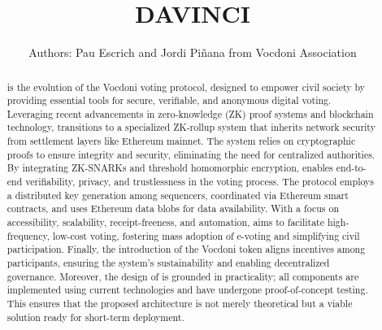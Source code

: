 \documentclass[runningheads, draft]{llncs}
\title{\textsc{DAVINCI}\vspace{-0.4cm}}
\author{Authors: Pau Escrich and Jordi Piñana from Vocdoni Association}
\institute{Last update: \today}
\begin{document}
	
\maketitle

\pagestyle{plain}
\thispagestyle{plain}

\begin{abstract}
		\Davinci is the evolution of the Vocdoni voting protocol, designed to empower civil society by providing essential tools for secure, verifiable, and anonymous digital voting. Leveraging recent advancements in zero-knowledge (ZK) proof systems and blockchain technology, \davinci transitions to a specialized ZK-rollup system that inherits network security from settlement layers like Ethereum mainnet. The system relies on cryptographic proofs to ensure integrity and security, eliminating the need for centralized authorities. By integrating ZK-SNARKs and threshold homomorphic encryption, \davinci enables end-to-end verifiability, privacy, and trustlessness in the voting process. The protocol employs a distributed key generation among sequencers, coordinated via Ethereum smart contracts, and uses Ethereum data blobs for data availability. With a focus on accessibility, scalability, receipt-freeness, and automation, \davinci aims to facilitate high-frequency, low-cost voting, fostering mass adoption of e-voting and simplifying civil participation. Finally, the introduction of the Vocdoni token aligns incentives among participants, ensuring the system's sustainability and enabling decentralized governance. 
		Moreover, the design of \davinci is grounded in practicality; all components are implemented using current technologies and have undergone proof-of-concept testing. This ensures that the proposed architecture is not merely theoretical but a viable solution ready for short-term deployment.
		
\end{abstract}


\end{document}
